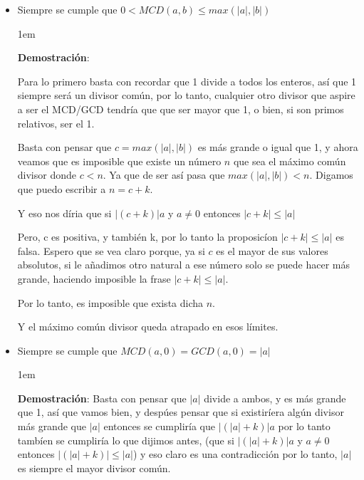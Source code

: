 \documentclass[12pt, fleqn]{report}                             %
\newenvironment{SmallIndentation}[1][0.75em]                    %
    {\begin{adjustwidth}{#1}{}\begin{footnotesize}}                 %
    {\end{footnotesize}\end{adjustwidth}}                           %
\begin{document}
            \begin{itemize}

                \item Siempre se cumple que $0 < MCD(a,b) \leq max(|a|,|b|)$

                    \begin{SmallIndentation}[1em]
                        \textbf{Demostración}:

                        Para lo primero basta con recordar que 1 divide a todos los enteros,
                        así que 1 siempre será un divisor común, por lo tanto, cualquier otro
                        divisor que aspire a ser el MCD/GCD tendría que que ser mayor que 1,
                        o bien, si son primos relativos, ser el 1.

                        Basta con pensar que $c=max(|a|,|b|)$ es más grande o igual que 1,
                        y ahora veamos que es imposible que existe un número $n$ que sea el
                        máximo común divisor donde $c < n$. Ya que de ser así pasa que
                        $max(|a|,|b|) < n$. Digamos que puedo escribir a $n=c+k$.

                        Y eso nos díria que si $|(c+k)|a$ y $a \neq 0$ entonces $|c+k| \leq |a|$

                        Pero, c es positiva, y también k, por lo tanto la proposicíon $|c+k| \leq |a|$
                        es falsa. Espero que se vea claro porque, ya si $c$ es el mayor de sus
                        valores absolutos, si le añadimos otro natural a ese número solo se puede hacer más
                        grande, haciendo imposible la frase $|c+k| \leq |a|$.

                        Por lo tanto, es imposible que exista dicha $n$.

                        Y el máximo común divisor queda atrapado en esos límites.

                    \end{SmallIndentation}


                \item Siempre se cumple que $MCD(a,0) = GCD(a,0) = |a|$

                    \begin{SmallIndentation}[1em]
                        \textbf{Demostración}:
                        Basta con pensar que $|a|$ divide a ambos, y es más grande que 1, así
                        que vamos bien, y despúes pensar que si existiríera algún divisor más
                        grande que $|a|$ entonces se cumpliría que  $|(|a|+k)|a$ por lo tanto tambíen
                        se cumpliría lo que dijimos antes, (que si $|(|a|+k)|a$ y $a \neq 0$
                        entonces $|(|a|+k)| \leq |a|$) y eso claro es una contradicción
                        por lo tanto, $|a|$ es siempre el mayor divisor común.


\end{SmallIndentation}
\end{itemize}
\end{document}
